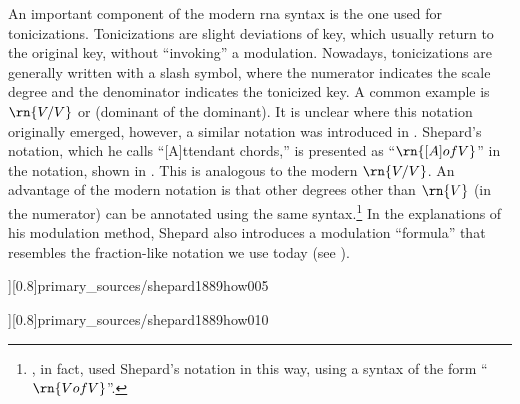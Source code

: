




An important component of the modern \gls{rna} syntax is the
one used for tonicizations. Tonicizations are slight
deviations of key, which usually return to the original key,
without ``invoking'' a modulation. Nowadays, tonicizations
are generally written with a slash symbol, where the
numerator indicates the scale degree and the denominator
indicates the tonicized key. A common example is $\rn{V/V}$
or (dominant of the dominant). It is unclear where this
notation originally emerged, however, a similar notation was
introduced in \textcite{shepard1889how}. Shepard's notation,
which he calls ``[A]ttendant chords,'' is presented as
``$\rn{[A] of V}$'' in the notation, shown in
. This is
analogous to the modern $\rn{V/V}$. An advantage of the
modern notation is that other degrees other than $\rn{V}$
(in the numerator) can be annotated using the same
syntax.\footnote{\textcite{piston1941harmony}, in fact, used
Shepard's notation in this way, using a syntax of the form
``$\rn{V of V}$''.} In the explanations of his modulation
method, Shepard also introduces a modulation ``formula''
that resembles the fraction-like notation we use today (see
). 

\phdfigure[Attendant chords in
\textcite[p.~5]{shepard1889how}][0.8]{primary_sources/shepard1889how005}

\phdfigure[Modulation formula in
 \textcite[p.~10]{shepard1889how}][0.8]{primary_sources/shepard1889how010}


